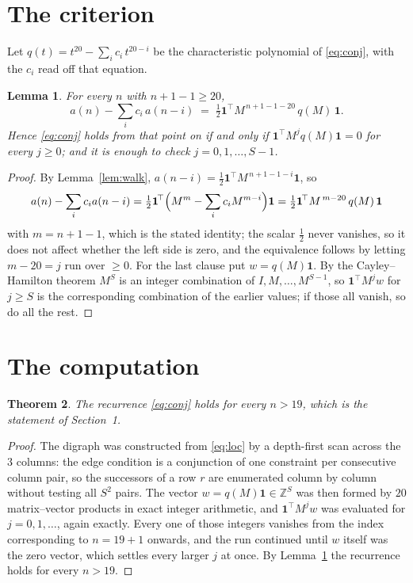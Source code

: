 \documentclass[11pt,a4paper]{article}
\theoremstyle{plain}
\newtheorem{theorem}{Theorem}
\newtheorem{lemma}[theorem]{Lemma}
\theoremstyle{definition}
\begin{document}
\section{The criterion}

Let $q(t)=t^{20}-\sum_i c_i\,t^{20-i}$ be the characteristic polynomial of
\eqref{eq:conj}, with the $c_i$ read off that equation.

\begin{lemma}\label{lem:crit}
For every $n$ with $n+1-1\ge20$,
\[
a(n)-\sum_i c_i\,a(n-i)\;=\;\tfrac1{2}\mathbf{1}^{\!\top}M^{\,n+1-1-20}\,q(M)\,\mathbf{1} .
\]
Hence \eqref{eq:conj} holds from that point on if and only if
$\mathbf{1}^{\!\top}M^{j}q(M)\mathbf{1}=0$ for every $j\ge0$; and it is enough to check
$j=0,1,\dots,S-1$.
\end{lemma}

\begin{proof}
By Lemma~\ref{lem:walk}, $a(n-i)=\tfrac1{2}\mathbf{1}^{\!\top}M^{\,n+1-1-i}\mathbf{1}$, so
\[
a(n)-\sum_i c_i a(n-i)
=\tfrac1{2}\mathbf{1}^{\!\top}\Bigl(M^{m}-\sum_i c_i M^{m-i}\Bigr)\mathbf{1}
=\tfrac1{2}\mathbf{1}^{\!\top}M^{\,m-20}\,q(M)\,\mathbf{1}
\]
with $m=n+1-1$, which is the stated identity; the scalar $\tfrac1{2}$ never vanishes, so it does not affect whether the left side is zero, and the equivalence follows by letting
$m-20=j$ run over $\ge0$. For the last clause put $w=q(M)\mathbf{1}$. By the
Cayley--Hamilton theorem $M^{S}$ is an integer combination of $I,M,\dots,M^{S-1}$, so
$\mathbf{1}^{\!\top}M^{j}w$ for $j\ge S$ is the corresponding combination of the earlier
values; if those all vanish, so do all the rest.
\end{proof}

\section{The computation}

\begin{theorem}
The recurrence \eqref{eq:conj} holds for every $n>19$, which is the statement of
Section~1.
\end{theorem}

\begin{proof}
The digraph was constructed from \eqref{eq:loc} by a depth-first scan across the $3$
columns: the edge condition is a conjunction of one constraint per consecutive column
pair, so the successors of a row $r$ are enumerated column by column without testing all
$S^2$ pairs. The vector $w=q(M)\mathbf{1}\in\mathbb{Z}^{S}$ was then formed by $20$
matrix--vector products in exact integer arithmetic, and $\mathbf{1}^{\!\top}M^{j}w$ was
evaluated for $j=0,1,\dots$, again exactly. Every one of those integers vanishes from the
index corresponding to $n=19+1$ onwards, and the run continued until $w$ itself was the
zero vector, which settles every larger $j$ at once. By Lemma~\ref{lem:crit} the recurrence
holds for every $n>19$.
\end{proof}
\end{document}
